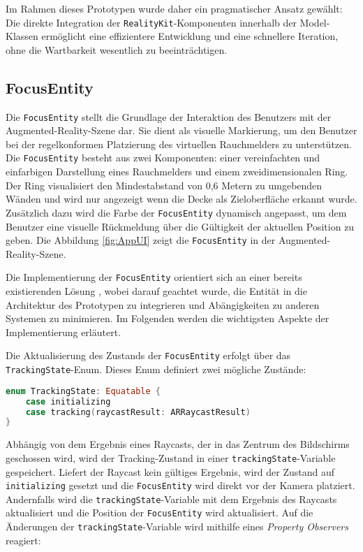Im Rahmen dieses Prototypen wurde daher ein pragmatischer Ansatz gewählt: Die direkte Integration der \texttt{RealityKit}-Komponenten innerhalb der Model-Klassen ermöglicht eine effizientere Entwicklung und eine schnellere Iteration, ohne die Wartbarkeit wesentlich zu beeinträchtigen.

\subsection{FocusEntity}

Die \texttt{FocusEntity} stellt die Grundlage der Interaktion des Benutzers mit der Augmented-Reality-Szene dar. Sie dient als visuelle Markierung, um den Benutzer bei der regelkonformen Platzierung des virtuellen Rauchmelders zu unterstützen. Die \texttt{FocusEntity} besteht aus zwei Komponenten: einer vereinfachten und einfarbigen Darstellung eines Rauchmelders und einem zweidimensionalen Ring. Der Ring visualisiert den Mindestabstand von 0,6 Metern zu umgebenden Wänden und wird nur angezeigt wenn die Decke als Zieloberfläche erkannt wurde. Zusätzlich dazu wird die Farbe der \texttt{FocusEntity} dynamisch angepasst, um dem Benutzer eine visuelle Rückmeldung über die Gültigkeit der aktuellen Position zu geben. Die Abbildung \ref{fig:AppUI} zeigt die \texttt{FocusEntity} in der Augmented-Reality-Szene.

Die Implementierung der \texttt{FocusEntity} orientiert sich an einer bereits existierenden Lösung \cite{cobb2019focusEntity}, wobei darauf geachtet wurde, die Entität in die Architektur des Prototypen zu integrieren und Abängigkeiten zu anderen Systemen zu minimieren. Im Folgenden werden die wichtigsten Aspekte der Implementierung erläutert.

Die Aktualisierung des Zustands der \texttt{FocusEntity} erfolgt über das \texttt{TrackingState}-Enum. Dieses Enum definiert zwei mögliche Zustände:

\begin{lstlisting}[language=Swift]
enum TrackingState: Equatable {
    case initializing
    case tracking(raycastResult: ARRaycastResult)
}
\end{lstlisting}

Abhängig von dem Ergebnis eines Raycasts, der in das Zentrum des Bildschirms geschossen wird, wird der Tracking-Zustand in einer \texttt{trackingState}-Variable gespeichert. Liefert der Raycast kein gültiges Ergebnis, wird der Zustand auf \texttt{initializing} gesetzt und die \texttt{FocusEntity} wird direkt vor der Kamera platziert. Andernfalls wird die \texttt{trackingState}-Variable mit dem Ergebnis des Raycasts aktualisiert und die Position der \texttt{FocusEntity} wird aktualisiert. Auf die Änderungen der \texttt{trackingState}-Variable wird mithilfe eines \textit{Property Observers} reagiert: 


